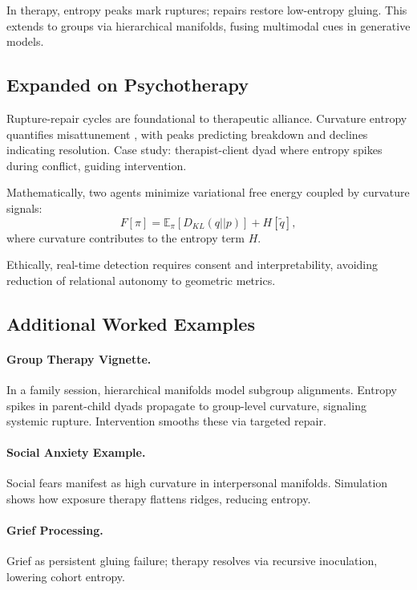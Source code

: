 \documentclass{article}
\theoremstyle{definition}
\begin{document}
In therapy, entropy peaks mark ruptures; repairs restore low-entropy gluing. This extends to groups via hierarchical manifolds, fusing multimodal cues in generative models.

\subsection{Expanded on Psychotherapy}

Rupture-repair cycles are foundational to therapeutic alliance. Curvature entropy quantifies misattunement \cite{bolis2017dialectical}, with peaks predicting breakdown and declines indicating resolution. Case study: therapist-client dyad where entropy spikes during conflict, guiding intervention.

Mathematically, two agents minimize variational free energy coupled by curvature signals:
\[
F[\pi] = \mathbb{E}_\pi [D_{KL}(q||p)] + H[\tilde{q}],
\]
where curvature contributes to the entropy term $H$.

Ethically, real-time detection requires consent and interpretability, avoiding reduction of relational autonomy to geometric metrics.

\subsection{Additional Worked Examples}

\paragraph{Group Therapy Vignette.}
In a family session, hierarchical manifolds model subgroup alignments. Entropy spikes in parent-child dyads propagate to group-level curvature, signaling systemic rupture. Intervention smooths these via targeted repair.

\paragraph{Social Anxiety Example.}
Social fears manifest as high curvature in interpersonal manifolds. Simulation shows how exposure therapy flattens ridges, reducing entropy.

\paragraph{Grief Processing.}
Grief as persistent gluing failure; therapy resolves via recursive inoculation, lowering cohort entropy.
\end{document}
